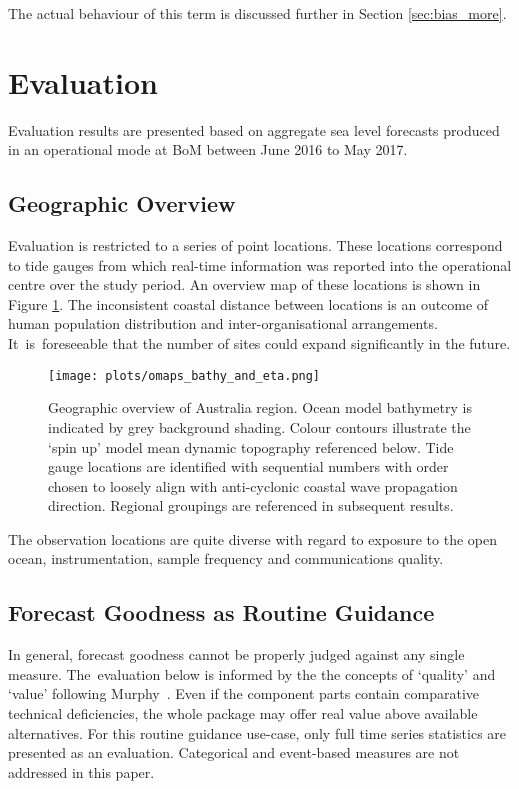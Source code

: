 \documentclass[jmse,article,accept,moreauthors,pdftex,10pt,a4paper]{mdpi}
\begin{document}
The actual behaviour of this term is discussed further in Section \ref{sec:bias_more}.

\section{Evaluation}

Evaluation results are presented based on aggregate sea level forecasts produced in an operational mode at BoM between June 2016 to May 2017.

\subsection{Geographic Overview}
Evaluation is restricted to a series of point locations.  These locations correspond to tide gauges from which real-time information was reported into the operational centre over the study period.  An overview map of these locations is shown in Figure \ref{fig:map_locations}.
The inconsistent coastal distance between locations is an outcome of human population distribution and inter-organisational arrangements.
It~is~foreseeable that the number of sites could expand significantly in the future.
\vspace{6pt}
\begin{figure}[H]
    \centering
    \texttt{[image: plots/omaps\_bathy\_and\_eta.png]}
    \caption{Geographic overview of Australia region.  Ocean model bathymetry is indicated by grey background shading.  Colour contours illustrate the `spin up' model mean dynamic topography referenced below.  Tide gauge locations are identified with sequential numbers with order chosen to loosely align with anti-cyclonic coastal wave propagation direction. Regional groupings are referenced in subsequent results.}
    \label{fig:map_locations}
\end{figure}  

The observation locations are quite diverse with regard to exposure to the open ocean, instrumentation, sample frequency and communications quality. 


\subsection{Forecast Goodness as Routine Guidance}
In general, forecast goodness cannot be properly judged against any single measure.
The~evaluation below is informed by the the concepts of `quality' and `value' following Murphy~\cite{Murphy:1993dh}.
Even if the component parts contain comparative technical deficiencies, the whole package may offer real value above available alternatives.
For this routine guidance use-case, only full time series statistics are presented as an evaluation. 
Categorical and event-based measures are not addressed in this paper.
\end{document}
